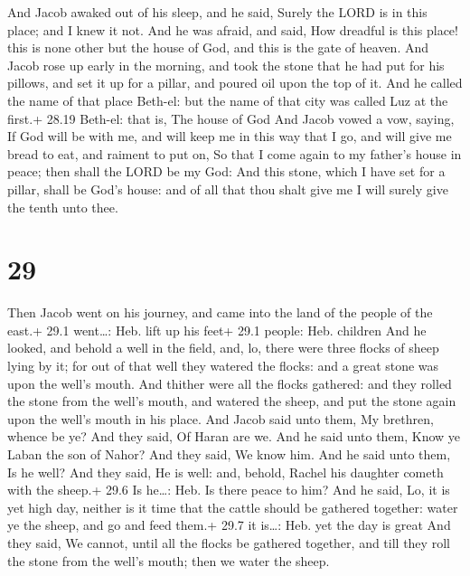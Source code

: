  And Jacob awaked out of his sleep, and he said, Surely
the LORD is in this place; and I knew it not.  And he was
afraid, and said, How dreadful is this place! this is none other but the
house of God, and this is the gate of heaven.  And Jacob
rose up early in the morning, and took the stone that he had put for his
pillows, and set it up for a pillar, and poured oil upon the top of it.
 And he called the name of that place Beth-el: but the name
of that city was called Luz at the first.+ 28.19 Beth-el: that is, The
house of God  And Jacob vowed a vow, saying, If God will be
with me, and will keep me in this way that I go, and will give me bread
to eat, and raiment to put on,  So that I come again to my
father's house in peace; then shall the LORD be my God: 
And this stone, which I have set for a pillar, shall be God's house: and
of all that thou shalt give me I will surely give the tenth unto thee.

\hypertarget{section-28}{%
\section{29}\label{section-28}}

 Then Jacob went on his journey, and came into the land of
the people of the east.+ 29.1 went\ldots: Heb. lift up his feet+ 29.1
people: Heb. children  And he looked, and behold a well in
the field, and, lo, there were three flocks of sheep lying by it; for
out of that well they watered the flocks: and a great stone was upon the
well's mouth.  And thither were all the flocks gathered: and
they rolled the stone from the well's mouth, and watered the sheep, and
put the stone again upon the well's mouth in his place.  And
Jacob said unto them, My brethren, whence be ye? And they said, Of Haran
are we.  And he said unto them, Know ye Laban the son of
Nahor? And they said, We know him.  And he said unto them,
Is he well? And they said, He is well: and, behold, Rachel his daughter
cometh with the sheep.+ 29.6 Is he\ldots: Heb. Is there peace to him?
 And he said, Lo, it is yet high day, neither is it time
that the cattle should be gathered together: water ye the sheep, and go
and feed them.+ 29.7 it is\ldots: Heb. yet the day is great 
And they said, We cannot, until all the flocks be gathered together, and
till they roll the stone from the well's mouth; then we water the sheep.

